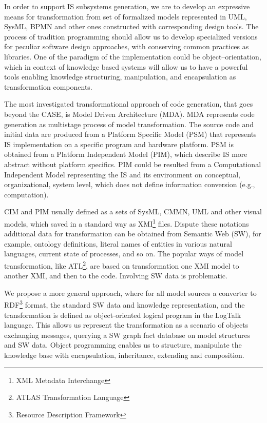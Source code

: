 \documentclass[conference]{IEEEtran}
\begin{document}
In order to support IS subsystems generation, we are to develop an expressive means for transformation from set of formalized models represented in UML, SysML, BPMN and other ones constructed with corresponding design tools.  The process of tradition programming should allow us to develop specialized versions for peculiar software design approaches, with conserving common practices as libraries.  One of the paradigm of the implementation could be object--orientation, which in context of knowledge based systems will allow us to have a powerful tools enabling knowledge structuring, manipulation, and encapsulation as transformation components.  %

The most investigated transformational approach of code generation, that goes beyond the CASE, is Model Driven Architecture (MDA).  MDA represents code generation as multistage process of model transformation.  The source code and initial data are produced from a Platform Specific Model (PSM) that represents IS implementation on a specific program and hardware platform.  PSM is obtained from a Platform Independent Model (PIM), which describe IS more abstract without platform specifics.  PIM could be resulted from a Computational Independent Model representing the IS and its environment on conceptual, organizational, system level, which does not define information conversion (e.g., computation).

CIM and PIM usually defined as a sets of SysML, CMMN, UML and other visual models, which saved in a standard way as XMI\footnote{XML Metadata Interchange} files.  Dispute these notations additional data for transformation can be obtained from Semantic Web (SW), for example, ontology definitions, literal names of entities in various natural languages, current state of processes, and so on.  The popular ways of model transformation, like ATL\footnote{ATLAS Transformation Language}, are based on transformation one XMI model to another XMI, and then to the code.  Involving SW data is problematic.

We propose a more general approach, where for all model sources a converter to RDF\footnote{Resource Description Framework} format, the standard SW data and knowledge representation, and the transformation is defined as object-oriented logical program in the LogTalk language.  This allows us represent the transformation as a scenario of objects exchanging messages, querying a SW graph fact database on model structures and SW data.  Object programming enables us to structure, manipulate the knowledge base with encapsulation, inheritance, extending and composition.
\end{document}
